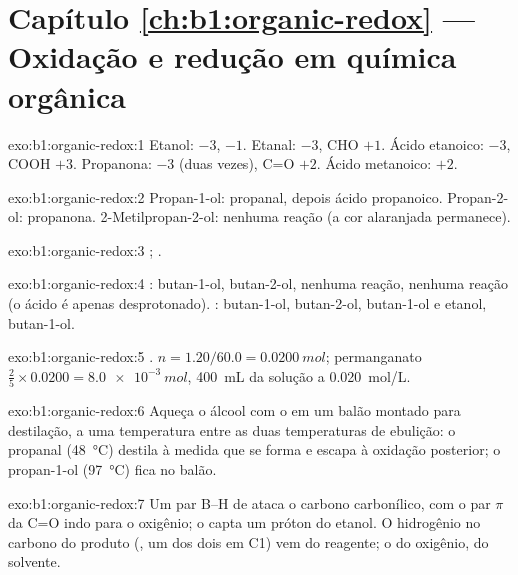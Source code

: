 \section*{Capítulo \ref{ch:b1:organic-redox} --- Oxidação e redução em química orgânica}

\begin{solution}{exo:b1:organic-redox:1}
Etanol:  $-3$,  $-1$. Etanal:  $-3$, CHO $+1$.
Ácido etanoico:  $-3$, COOH $+3$. Propanona:  $-3$ (duas vezes),
C=O $+2$. Ácido metanoico: $+2$.
\end{solution}

\begin{solution}{exo:b1:organic-redox:2}
Propan-1-ol: propanal, depois ácido propanoico. Propan-2-ol: propanona.
2-Metilpropan-2-ol: nenhuma reação (a cor alaranjada permanece).
\end{solution}

\begin{solution}{exo:b1:organic-redox:3}
;
.
\end{solution}

\begin{solution}{exo:b1:organic-redox:4}
: butan-1-ol, butan-2-ol, nenhuma reação, nenhuma reação (o
ácido é apenas desprotonado). : butan-1-ol, butan-2-ol,
butan-1-ol e etanol, butan-1-ol.
\end{solution}

\begin{solution}{exo:b1:organic-redox:5}
.
$n = 1.20/60.0 = \qty{0.0200}{mol}$; permanganato $\frac25 \times 0.0200 =
\qty{8.0e-3}{mol}$, \qty{400}{mL} da solução a \qty{0.020}{mol/L}.
\end{solution}

\begin{solution}{exo:b1:organic-redox:6}
Aqueça o álcool com o  em um balão montado para destilação, a uma
temperatura entre as duas temperaturas de ebulição: o propanal
(\qty{48}{\celsius}) destila à medida que se forma e escapa à oxidação
posterior; o propan-1-ol (\qty{97}{\celsius}) fica no balão.
\end{solution}

\begin{solution}{exo:b1:organic-redox:7}
Um par B--H de  ataca o carbono carbonílico, com o par $\pi$ da
C=O indo para o oxigênio; o  capta um próton do etanol. O
hidrogênio no carbono do produto (, um dos dois em C1) vem
do reagente; o do oxigênio, do solvente.
\end{solution}


